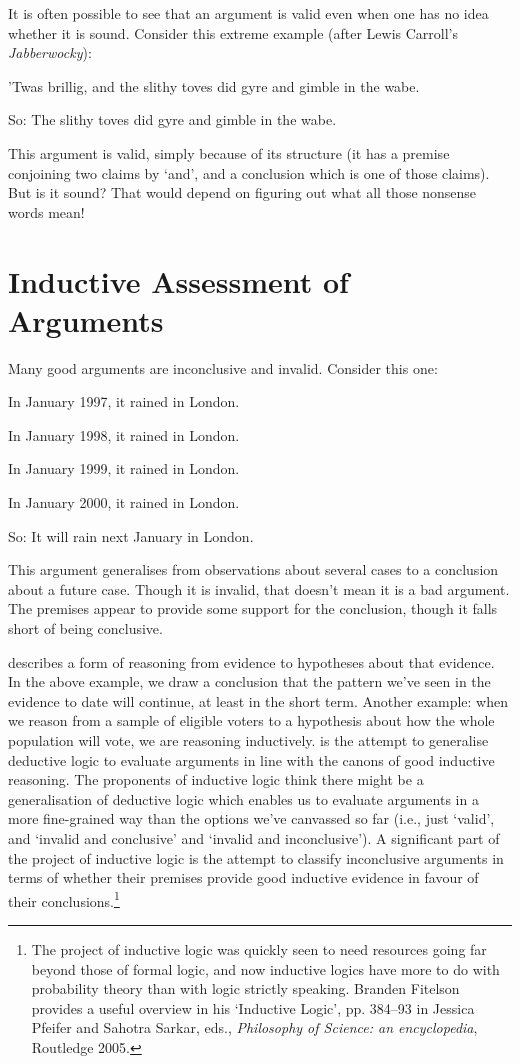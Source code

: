 It is often possible to see that an argument is valid even when one has no idea whether it is sound. Consider this extreme example (after Lewis Carroll's \emph{Jabberwocky}):
\begin{earg}
	\item[] ’Twas brillig, \textsf{and} the slithy toves did gyre and gimble in the wabe.
	\item[So:] The slithy toves did gyre and gimble in the wabe.
\end{earg} This argument is valid, simply because of its structure (it has a premise conjoining two claims by `and', and a conclusion which is one of those claims). But is it sound? That would depend on figuring out what all those nonsense words mean!

\section{Inductive Assessment of Arguments}
Many good arguments are inconclusive and invalid. Consider this one:
	\begin{earg}
		\item[] In January 1997, it rained in London.
		\item[] In January 1998, it rained in London.
		\item[] In January 1999, it rained in London.
		\item[] In January 2000, it rained in London.
	\item[So:] It will rain next January in London.
\end{earg}
This argument generalises from observations about several cases to a conclusion about a future case. Though it is invalid, that doesn't mean it is a bad argument. The premises appear to provide some support for the conclusion, though it falls short of being conclusive. 

 describes a form of reasoning from evidence to hypotheses about that evidence. In the above example, we draw a conclusion that the pattern we've seen in the evidence to date will continue, at least in the short term. Another example: when we reason from a sample of eligible voters to a hypothesis about how the whole population will vote, we are reasoning inductively.  is the attempt to generalise deductive logic to evaluate arguments in line with the canons of good inductive reasoning. The proponents of inductive logic think there might be a generalisation of deductive logic which enables us to evaluate arguments in a more fine-grained way than the options we've canvassed so far (i.e., just `valid', and `invalid and conclusive' and `invalid and inconclusive'). A significant part of the project of inductive logic is the attempt to classify inconclusive arguments in terms of whether their premises provide good inductive evidence in favour of their conclusions.\footnote{The project of inductive logic was quickly seen to need resources going far beyond those of formal logic, and now inductive logics have more to do with probability theory than with logic strictly speaking. Branden Fitelson provides a useful overview in his `Inductive Logic', pp. 384--93 in Jessica Pfeifer and Sahotra Sarkar, eds., \emph{Philosophy of Science: an encyclopedia}, Routledge 2005.} 

